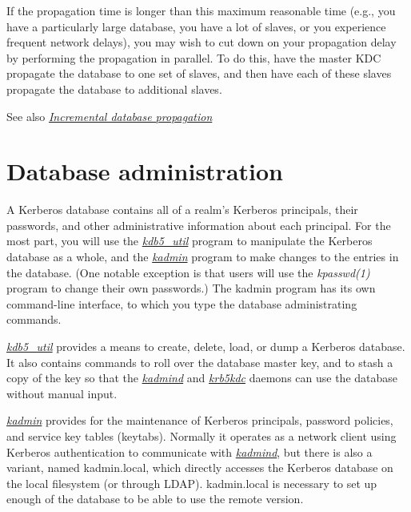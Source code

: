 \documentclass[letterpaper,10pt,english]{sphinxmanual}
\begin{document}
If the propagation time is longer than this maximum reasonable time
(e.g., you have a particularly large database, you have a lot of
slaves, or you experience frequent network delays), you may wish to
cut down on your propagation delay by performing the propagation in
parallel.  To do this, have the master KDC propagate the database to
one set of slaves, and then have each of these slaves propagate the
database to additional slaves.

See also {\hyperref[admin/database:incr-db-prop]{\emph{Incremental database propagation}}}


\chapter{Database administration}
\label{admin/database::doc}\label{admin/database:database-administration}
A Kerberos database contains all of a realm's Kerberos principals,
their passwords, and other administrative information about each
principal.  For the most part, you will use the {\hyperref[admin/admin_commands/kdb5_util:kdb5-util-8]{\emph{kdb5\_util}}}
program to manipulate the Kerberos database as a whole, and the
{\hyperref[admin/admin_commands/kadmin_local:kadmin-1]{\emph{kadmin}}} program to make changes to the entries in the
database.  (One notable exception is that users will use the
\emph{kpasswd(1)} program to change their own passwords.)  The kadmin
program has its own command-line interface, to which you type the
database administrating commands.

{\hyperref[admin/admin_commands/kdb5_util:kdb5-util-8]{\emph{kdb5\_util}}} provides a means to create, delete, load, or dump
a Kerberos database.  It also contains commands to roll over the
database master key, and to stash a copy of the key so that the
{\hyperref[admin/admin_commands/kadmind:kadmind-8]{\emph{kadmind}}} and {\hyperref[admin/admin_commands/krb5kdc:krb5kdc-8]{\emph{krb5kdc}}} daemons can use the database
without manual input.

{\hyperref[admin/admin_commands/kadmin_local:kadmin-1]{\emph{kadmin}}} provides for the maintenance of Kerberos principals,
password policies, and service key tables (keytabs).  Normally it
operates as a network client using Kerberos authentication to
communicate with {\hyperref[admin/admin_commands/kadmind:kadmind-8]{\emph{kadmind}}}, but there is also a variant, named
kadmin.local, which directly accesses the Kerberos database on the
local filesystem (or through LDAP).  kadmin.local is necessary to set
up enough of the database to be able to use the remote version.
\end{document}
